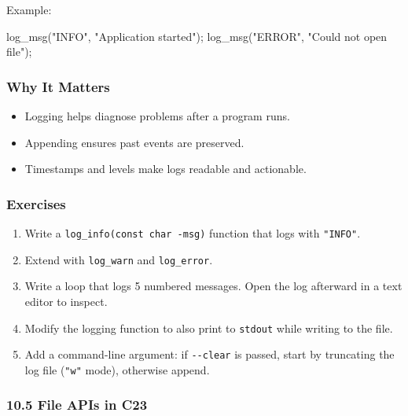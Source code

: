 \documentclass[
  letterpaper,
  DIV=11,
  numbers=noendperiod]{scrreprt}
\newenvironment{Shaded}{\begin{snugshade}}{\end{snugshade}}
\newcommand{\NormalTok}[1]{\textcolor[rgb]{0.00,0.23,0.31}{#1}}
\newcommand{\OperatorTok}[1]{\textcolor[rgb]{0.37,0.37,0.37}{#1}}
\newcommand{\StringTok}[1]{\textcolor[rgb]{0.13,0.47,0.30}{#1}}
\providecommand{\tightlist}{%
  \setlength{\itemsep}{0pt}\setlength{\parskip}{0pt}}
\begin{document}
Example:

\begin{Shaded}
\begin{Highlighting}[]
\NormalTok{log\_msg}\OperatorTok{(}\StringTok{"INFO"}\OperatorTok{,} \StringTok{"Application started"}\OperatorTok{);}
\NormalTok{log\_msg}\OperatorTok{(}\StringTok{"ERROR"}\OperatorTok{,} \StringTok{"Could not open file"}\OperatorTok{);}
\end{Highlighting}
\end{Shaded}

\subsubsection{Why It Matters}\label{why-it-matters-46}

\begin{itemize}
\tightlist
\item
  Logging helps diagnose problems after a program runs.
\item
  Appending ensures past events are preserved.
\item
  Timestamps and levels make logs readable and actionable.
\end{itemize}

\subsubsection{Exercises}\label{exercises-48}

\begin{enumerate}
\def\labelenumi{\arabic{enumi}.}
\tightlist
\item
  Write a \texttt{log\_info(const\ char\ -msg)} function that logs with
  \texttt{"INFO"}.
\item
  Extend with \texttt{log\_warn} and \texttt{log\_error}.
\item
  Write a loop that logs 5 numbered messages. Open the log afterward in
  a text editor to inspect.
\item
  Modify the logging function to also print to \texttt{stdout} while
  writing to the file.
\item
  Add a command-line argument: if \texttt{-\/-clear} is passed, start by
  truncating the log file (\texttt{"w"} mode), otherwise append.
\end{enumerate}

\subsubsection{10.5 File APIs in C23}\label{file-apis-in-c23}
\end{document}
